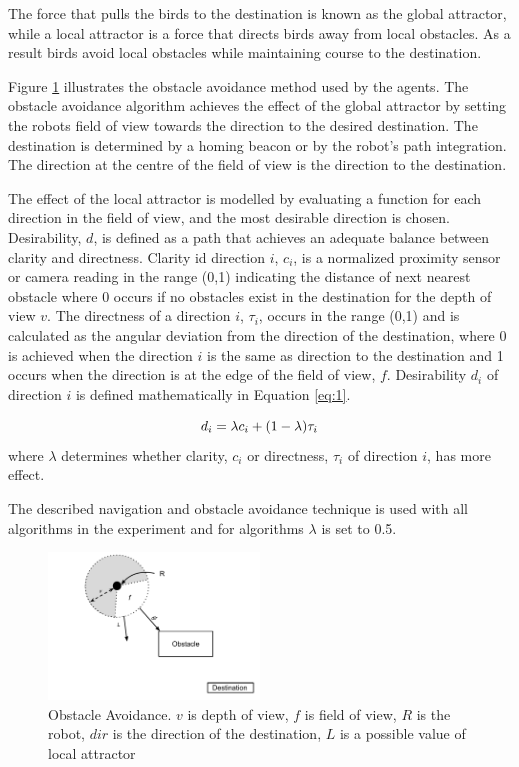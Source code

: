 The force that pulls the birds to the destination is known as the global attractor, while a local attractor is a force that directs birds away from local obstacles. As a result birds avoid local obstacles while maintaining course to the destination. 

Figure \ref{fig:obstacleavoidance} illustrates the obstacle avoidance method used by the agents. The obstacle avoidance algorithm achieves the effect of the global attractor by setting the robots field of view towards the direction to the desired destination. The destination is determined by a homing beacon or by the robot's path integration. The direction at the centre of the field of view is the direction to the destination. 

The effect of the local attractor is modelled by evaluating a function for each direction in the field of view, and the most desirable direction is chosen. Desirability, $d$, is defined as a path that achieves an adequate balance between clarity and directness. Clarity id direction $i$, $c_i$, is a normalized proximity sensor or camera reading in the range (0,1) indicating the distance of next nearest obstacle where 0 occurs if no obstacles exist in the destination for the depth of view $v$. The directness of a direction $i$, $\tau_i$, occurs in the range (0,1) and is calculated as the angular deviation from the direction of the destination, where 0 is achieved when the direction $i$ is the same as direction to the destination and 1 occurs when the direction is at the edge of the field of view, $f$. Desirability $d_i$ of direction $i$ is defined mathematically in Equation \ref{eq:1}.

\begin{equation}
	d_i= \lambda c_i + (1 - \lambda)\tau_i \\
	\label{eq:1}
\end{equation} where $\lambda$ determines whether clarity, $c_i$ or directness, $\tau_i$ of direction $i$, has more effect.
 
The described navigation and obstacle avoidance technique is used with all algorithms in the experiment and for algorithms $\lambda$ is set to 0.5.

\begin{figure}
	\centering
	\includegraphics[width=0.5\textwidth]{chapters/chapter5/figures/ObstacleAvoidance.pdf}
	\caption{Obstacle Avoidance. $v$ is depth of view, $f$ is field of view, $R$ is the robot, $dir$ is the direction of the destination, $L$ is a possible value of local attractor}
	\label{fig:obstacleavoidance}
\end{figure}


